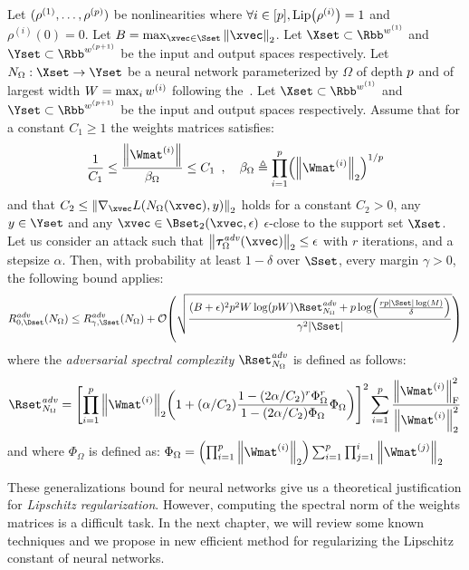 \begin{theorem}
  Let $(\rho^{(1)}, \dots, \rho^{(p)})$ be nonlinearities where $\forall i \in [\depth], \lip{\rho^{(i)}} = 1$ and $\rho^{(i)}(0) = 0$.
  Let $B = \max_{\xvec \in \Sset} \norm{\xvec}_2$.
  Let $\Xset \subset \Rbb^{\dimw^{(1)}}$ and $\Yset \subset \Rbb^{\dimw^{(\depth+1)}}$ be the input and output spaces respectively.
  Let $N_\Omega: \Xset \rightarrow \Yset$ be a neural network parameterized by $\Omega$ of depth $p$ and of largest width $W = \max_i w^{(i)}$ following the~.
  Let $\Xset \subset \Rbb^{\dimw^{(1)}}$ and $\Yset \subset \Rbb^{\dimw^{(\depth+1)}}$ be the input and output spaces respectively.
  Assume that for a constant $C_1 \geq 1$ the weights matrices satisfies:
  \begin{equation}
    \frac{1}{C_1} \leq \frac{\norm{\Wmat^{(i)}}}{\beta_\Omega} \leq C_1 \enspace, \quad \beta_\Omega \triangleq \prod_{i=1}^\depth \left(\norm{\Wmat^{(i)}}_2\right)^{1/\depth}
  \end{equation}
  and that $C_2 \leq \norm{\nabla_\xvec L(N_\Omega(\xvec), y)}_2$ holds for a constant $C_2 > 0$, any $y \in \Yset$ and any $\xvec \in \Bset_2(\xvec, \epsilon)$ $\epsilon$-close to the support set $\Xset$.
  Let us consider an attack such that $\norm{\adv^{\text{\emph{adv}}}_\Omega(\xvec)}_2 \leq \epsilon$ with $r$ iterations, and a stepsize $\alpha$.
  Then, with probability at least $1 - \delta$ over $\Sset$, every margin $\gamma > 0$, the following bound applies:
  \begin{equation}
    R_{0, \Dset}^{\text{\emph{adv}}}(N_\Omega) \leq R_{\gamma, \Sset}^{\text{\emph{adv}}}(N_\Omega) + \bigO \left( \sqrt{\frac{(B + \epsilon)^2 \depth^2 W \log(\depth W) \Rset^{\text{\emph{adv}}}_{N_\Omega} + \depth \log(\frac{r \depth |\Sset| \log(M)}{\delta})}{\gamma^2 |\Sset|}} \right)
  \end{equation}
  where the \emph{adversarial spectral complexity} $\Rset^{\text{\emph{adv}}}_{N_\Omega}$ is defined as follows:
  \begin{equation}
    \Rset^{\text{\emph{adv}}}_{N_\Omega} = \left[ \prod_{i=1}^\depth \norm{\Wmat^{(i)}}_2 \left( 1 + (\alpha / C_2) \frac{1 - (2\alpha/C_2)^r \Phi_\Omega^r }{1 - (2\alpha/C_2) \Phi_\Omega } \Phi_\Omega  \right) \right]^2 \sum_{i = 1}^\depth \frac{\norm{\Wmat^{(i)}}_\fro^2}{\norm{\Wmat^{(i)}}_2^2}
  \end{equation}
  and where $\Phi_\Omega$ is defined as: $\Phi_\Omega = \left(\prod_{i=1}^\depth \norm{\Wmat^{(i)}}_2 \right) \sum_{i=1}^\depth \prod_{j=1}^{i} \norm{\Wmat^{(j)}}_2$
\end{theorem}

These generalizations bound for neural networks give us a theoretical justification for \emph{Lipschitz regularization}.
However, computing the spectral norm of the weights matrices is a difficult task.
In the next chapter, we will review some known techniques and we propose in  new efficient method for regularizing the Lipschitz constant of neural networks.






